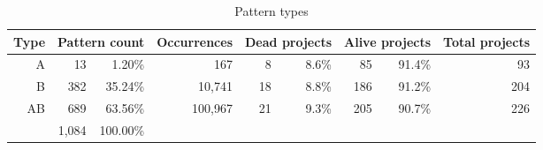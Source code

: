 \begin{table}[H]
\caption{Pattern types}\label{table:pattern_type_counts}
\centering
\begin{tabular}{rrr|r|rrrrr}
\hline
	\bfseries{Type}\rm
	& \multicolumn{2}{r|}{\bfseries{Pattern count}\rm}
	& \bfseries{Occurrences}\rm
	& \multicolumn{2}{r}{\bfseries{Dead projects}\rm}
	& \multicolumn{2}{r}{\bfseries{Alive projects}\rm}
	& \bfseries{Total projects}\rm \\
	\hline
	A & 13 & 1.20\% & 167 & 8 & 8.6\% & 85 & 91.4\% & 93 \\
	B & 382 & 35.24\% & 10,741 & 18 & 8.8\% & 186 & 91.2\% & 204 \\
	AB & 689 & 63.56\% & 100,967 & 21 & 9.3\% & 205 & 90.7\% & 226 \\
	\hline
	 & 1,084 & 100.00\% &  \\
\hline
\end{tabular}
\end{table}
